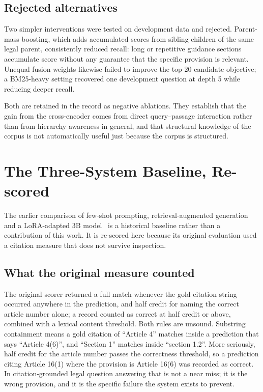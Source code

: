 \subsection{Rejected alternatives}

Two simpler interventions were tested on development data and rejected.
Parent-mass boosting, which adds accumulated scores from sibling children of the
same legal parent, consistently reduced recall: long or repetitive guidance
sections accumulate score without any guarantee that the specific provision is
relevant. Unequal fusion weights likewise failed to improve the top-20 candidate
objective; a BM25-heavy setting recovered one development question at depth 5
while reducing deeper recall.

Both are retained in the record as negative ablations. They establish that the
gain from the cross-encoder comes from direct query--passage interaction rather
than from hierarchy awareness in general, and that structural knowledge of the
corpus is not automatically useful just because the corpus is structured.

\section{The Three-System Baseline, Re-scored}
\label{sec:baselines}

The earlier comparison of few-shot prompting, retrieval-augmented generation and
a LoRA-adapted 3B model~\cite{hu2022lora} is a historical baseline rather than a
contribution of this work. It is re-scored here because its original evaluation
used a citation measure that does not survive inspection.

\subsection{What the original measure counted}

The original scorer returned a full match whenever the gold citation string
occurred anywhere in the prediction, and half credit for naming the correct
article number alone; a record counted as correct at half credit or above,
combined with a lexical content threshold. Both rules are unsound. Substring
containment means a gold citation of \enquote{Article 4} matches inside a
prediction that says \enquote{Article 4(6)}, and \enquote{Section 1} matches
inside \enquote{section 1.2}. More seriously, half credit for the article number
passes the correctness threshold, so a prediction citing Article 16(1) where the
provision is Article 16(6) was recorded as correct. In citation-grounded legal
question answering that is not a near miss; it is the wrong provision, and it is
the specific failure the system exists to prevent.

